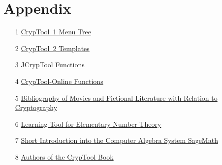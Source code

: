 \documentclass[a4paper,11pt,oneside,ngerman,english]{book}  %
\begin{document}
\begin{appendix}
\newpage
\hypertarget{appendix-start}{}\label{s:appendix-start}
\chapter{Appendix}
    \begin{itemize}
      \item[1] \hyperlink{appendix-menu-overview-CT1}{CrypTool~1 Menu Tree}
      \item[2] \hyperlink{appendix-template-overview-CT2}{CrypTool~2 Templates}
      \item[3] \hyperlink{appendix-function-overview-JCT}{JCrypTool Functions}
      \item[4] \hyperlink{appendix-function-overview-CTO}{CrypTool-Online Functions}
      \item[5] \hyperlink{appendix-movies}{Bibliography of Movies and
                          Fictional Literature with Relation to Cryptography}
      \item[6] \hyperlink{appendix-Learn-NT}
                         {Learning Tool for Elementary Number Theory}
      \item[7] \hyperlink{appendix-using-sage}
                         {Short Introduction into the Computer Algebra System SageMath}
      \item[8] \hyperlink{appendix-authors}{Authors of the CrypTool Book}
    \end{itemize}
  \newpage
  \renewcommand{\CTBChapName}{(Appendix Menus)}      
  \renewcommand{\CTBChapName}{(Appendix LearnTool)}  
  \renewcommand{\CTBChapName}{(Appendix Sage)}       
  \renewcommand{\CTBChapName}{(Appendix Authors)}    
\end{appendix}

\renewcommand{\CTBChapName}{(Appendix gnu-fdl)}      


\begingroup
  \renewcommand*{\addvspace}[1]{}

  \clearpage{}
  \listoffigures

  \clearpage{}
  \listoftables
\end{document}
